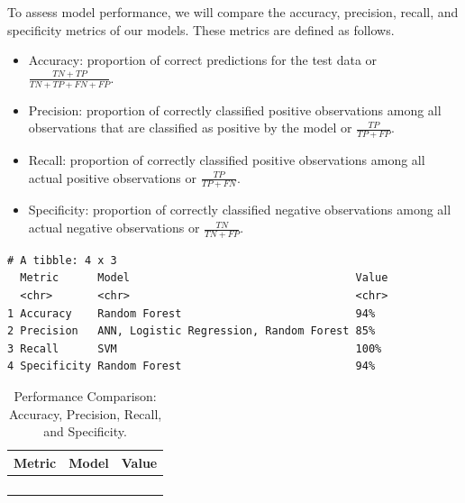 \documentclass[
  letterpaper,
  DIV=11,
  numbers=noendperiod]{scrartcl}
\begin{document}
To assess model performance, we will compare the accuracy, precision,
recall, and specificity metrics of our models. These metrics are defined
as follows.

\begin{itemize}
\item
  Accuracy: proportion of correct predictions for the test data or
  \(\frac{TN + TP}{TN + TP + FN + FP}\).
\item
  Precision: proportion of correctly classified positive observations
  among all observations that are classified as positive by the model or
  \(\frac{TP}{TP + FP}\).
\item
  Recall: proportion of correctly classified positive observations among
  all actual positive observations or \(\frac{TP}{TP + FN}\).
\item
  Specificity: proportion of correctly classified negative observations
  among all actual negative observations or \(\frac{TN}{TN + FP}\).
\end{itemize}

\begin{verbatim}
# A tibble: 4 x 3
  Metric      Model                                   Value
  <chr>       <chr>                                   <chr>
1 Accuracy    Random Forest                           94%  
2 Precision   ANN, Logistic Regression, Random Forest 85%  
3 Recall      SVM                                     100% 
4 Specificity Random Forest                           94%  
\end{verbatim}

\begin{longtable}{>{\raggedright\arraybackslash}p{}>{\raggedright\arraybackslash}p{}>{\raggedleft\arraybackslash}p{}}

\caption{\label{tbl-overall-performance}Performance Comparison:
Accuracy, Precision, Recall, and Specificity.}

\tabularnewline

\toprule
Metric & Model & Value \\ 
\midrule\addlinespace[2.5pt]
\cellcolor[HTML]{FFFFFF}{Accuracy} & \cellcolor[HTML]{FFFFFF}{Random Forest} & \cellcolor[HTML]{FFFFFF}{94\%} \\ 
\cellcolor[HTML]{FFFFFF}{Precision} & \cellcolor[HTML]{FFFFFF}{ANN, Logistic Regression, Random Forest} & \cellcolor[HTML]{FFFFFF}{85\%} \\ 
\cellcolor[HTML]{FFFFFF}{Recall} & \cellcolor[HTML]{FFFFFF}{SVM} & \cellcolor[HTML]{FFFFFF}{100\%} \\ 
\cellcolor[HTML]{FFFFFF}{Specificity} & \cellcolor[HTML]{FFFFFF}{Random Forest} & \cellcolor[HTML]{FFFFFF}{94\%} \\ 
\bottomrule

\end{longtable}
\end{document}
